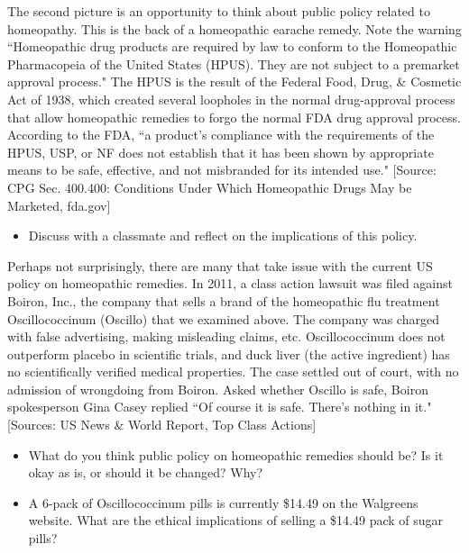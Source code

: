 \documentclass[12pt]{article}
\begin{document}
\noindent The second picture is an opportunity to think about public policy related to homeopathy. This is the back of a homeopathic earache remedy. Note the warning ``Homeopathic drug products are required by law to conform to the Homeopathic Pharmacopeia of the United States (HPUS). They are not subject to a premarket approval process." The HPUS is the result of the Federal Food, Drug, \& Cosmetic Act of 1938, which created several loopholes in the normal drug-approval process that allow homeopathic remedies to forgo the normal FDA drug approval process. According to the FDA, ``a product's compliance with the requirements of the HPUS, USP, or NF does not establish that it has been shown by appropriate means to be safe, effective, and not misbranded for its intended use." [Source: CPG Sec. 400.400: Conditions Under Which Homeopathic Drugs May be Marketed, fda.gov]
\begin{itemize}
\item Discuss with a classmate and reflect on the implications of this policy. 
\end{itemize}

\noindent Perhaps not surprisingly, there are many that take issue with the current US policy on homeopathic remedies. In 2011, a class action lawsuit was filed against Boiron, Inc., the company that sells a brand of the homeopathic flu treatment Oscillococcinum (Oscillo) that we examined above. The company was charged with false advertising, making misleading claims, etc. Oscillococcinum does not outperform placebo in scientific trials, and duck liver (the active ingredient) has no scientifically verified medical properties. The case settled out of court, with no admission of wrongdoing from Boiron. Asked whether Oscillo is safe, Boiron spokesperson Gina Casey replied ``Of course it is safe. There's nothing in it." [Sources: US News \& World Report, Top Class Actions]

\begin{itemize}
\item What do you think public policy on homeopathic remedies should be? Is it okay as is, or should it be changed? Why?
\item A 6-pack of Oscillococcinum pills is currently \$14.49 on the Walgreens website. What are the ethical implications of selling a \$14.49 pack of sugar pills? 
\end{itemize}
\end{document}
